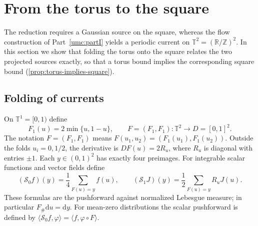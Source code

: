 \documentclass[11pt]{article}
\theoremstyle{definition}
\theoremstyle{remark}
\numberwithin{equation}{section}
\newcommand{\T}{\mathbb T}
\begin{document}
\section{From the torus to the square}
\label{sec:fold}
The reduction requires a Gaussian source on the square, whereas the
flow construction of Part~\ref{umc:partI} yields a periodic current on
$\T^2=(\mathbb R/\mathbb Z)^2$. In this section we show that folding the
torus onto the square relates the two projected sources exactly, so that
a torus bound implies the corresponding square bound
(\cref{prop:torus-implies-square}).

\subsection{Folding of currents}
On $\T^1=[0,1)$ define
\[
 F_1(u)=2\min\{u,1-u\},\qquad
 F=(F_1,F_1):\T^2\longrightarrow D=[0,1]^2.
\]
The notation $F=(F_1,F_1)$ means $F(u_1,u_2)=(F_1(u_1),F_1(u_2))$.
Outside the folds $u_i=0,1/2$, the derivative is
$DF(u)=2R_u$, where $R_u$ is diagonal with entries $\pm1$. Each
$y\in(0,1)^2$ has exactly four preimages.
For integrable scalar functions and vector fields define
\begin{equation}
 (\mathscr S_0 f)(y)=\frac14\sum_{F(u)=y}f(u),\qquad
 (\mathscr S_1 J)(y)=\frac12\sum_{F(u)=y}R_u J(u).
 \label{eq:unit-fold}
\end{equation}
These formulas are the pushforward against normalized Lebesgue measure;
in particular $F_\#\mathrm du=\mathrm dy$.
For mean-zero distributions the scalar pushforward is defined by
$\langle\mathscr S_0 f,\varphi\rangle
=\langle f,\varphi\circ F\rangle$.
\end{document}
